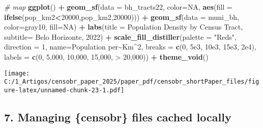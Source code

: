 \documentclass[
]{article}
\newenvironment{Shaded}{\begin{snugshade}}{\end{snugshade}}
\newcommand{\AttributeTok}[1]{\textcolor[rgb]{0.13,0.29,0.53}{#1}}
\newcommand{\CommentTok}[1]{\textcolor[rgb]{0.56,0.35,0.01}{\textit{#1}}}
\newcommand{\ConstantTok}[1]{\textcolor[rgb]{0.56,0.35,0.01}{#1}}
\newcommand{\DecValTok}[1]{\textcolor[rgb]{0.00,0.00,0.81}{#1}}
\newcommand{\FloatTok}[1]{\textcolor[rgb]{0.00,0.00,0.81}{#1}}
\newcommand{\FunctionTok}[1]{\textcolor[rgb]{0.13,0.29,0.53}{\textbf{#1}}}
\newcommand{\NormalTok}[1]{#1}
\newcommand{\SpecialCharTok}[1]{\textcolor[rgb]{0.81,0.36,0.00}{\textbf{#1}}}
\newcommand{\StringTok}[1]{\textcolor[rgb]{0.31,0.60,0.02}{#1}}
\begin{document}
\begin{Shaded}
\begin{Highlighting}[]
\CommentTok{\# map}
\FunctionTok{ggplot}\NormalTok{() }\SpecialCharTok{+}
  \FunctionTok{geom\_sf}\NormalTok{(}\AttributeTok{data =}\NormalTok{ bh\_tracts22, }\AttributeTok{color=}\ConstantTok{NA}\NormalTok{,}
          \FunctionTok{aes}\NormalTok{(}\AttributeTok{fill =} \FunctionTok{ifelse}\NormalTok{(pop\_km2}\SpecialCharTok{\textless{}}\DecValTok{20000}\NormalTok{,pop\_km2,}\DecValTok{20000}\NormalTok{))) }\SpecialCharTok{+}
  \FunctionTok{geom\_sf}\NormalTok{(}\AttributeTok{data =}\NormalTok{ muni\_bh, }\AttributeTok{color=}\StringTok{\textquotesingle{}gray10\textquotesingle{}}\NormalTok{, }\AttributeTok{fill=}\ConstantTok{NA}\NormalTok{) }\SpecialCharTok{+}
  \FunctionTok{labs}\NormalTok{(}\AttributeTok{title =} \StringTok{\textquotesingle{}Population Density by Census Tract\textquotesingle{}}\NormalTok{,}
       \AttributeTok{subtitle=} \StringTok{\textquotesingle{}Belo Horizonte, 2022\textquotesingle{}}\NormalTok{) }\SpecialCharTok{+}
  \FunctionTok{scale\_fill\_distiller}\NormalTok{(}\AttributeTok{palette =} \StringTok{"Reds"}\NormalTok{, }\AttributeTok{direction =} \DecValTok{1}\NormalTok{,}
                       \AttributeTok{name=}\StringTok{\textquotesingle{}Population per\textquotesingle{}}\SpecialCharTok{\textasciitilde{}}\NormalTok{Km}\SpecialCharTok{\^{}}\DecValTok{2}\NormalTok{,}
                       \AttributeTok{breaks =} \FunctionTok{c}\NormalTok{(}\DecValTok{0}\NormalTok{,  }\FloatTok{5e3}\NormalTok{, }\FloatTok{10e3}\NormalTok{, }\FloatTok{15e3}\NormalTok{, }\FloatTok{2e4}\NormalTok{),}
                       \AttributeTok{labels  =} \FunctionTok{c}\NormalTok{(}\StringTok{\textquotesingle{}0\textquotesingle{}}\NormalTok{,  }\StringTok{\textquotesingle{}5,000\textquotesingle{}}\NormalTok{, }\StringTok{\textquotesingle{}10,000\textquotesingle{}}\NormalTok{, }\StringTok{\textquotesingle{}15,000\textquotesingle{}}\NormalTok{, }\StringTok{\textquotesingle{}\textgreater{} 20,000\textquotesingle{}}\NormalTok{)) }\SpecialCharTok{+}
  \FunctionTok{theme\_void}\NormalTok{()}
\end{Highlighting}
\end{Shaded}

\texttt{[image: C:/1\_Artigos/censobr\_paper\_2025/paper\_pdf/censobr\_shortPaper\_files/figure-latex/unnamed-chunk-23-1.pdf]}

\subsection{7. Managing \{censobr\} files cached
locally}\label{managing-censobr-files-cached-locally}
\end{document}
